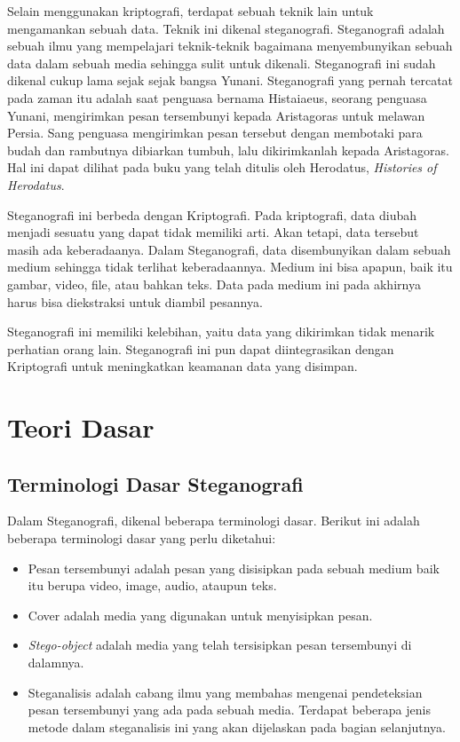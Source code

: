 \documentclass[10pt,conference]{IEEEtran}
\begin{document}
Selain menggunakan kriptografi, terdapat sebuah teknik lain untuk mengamankan sebuah data. Teknik ini dikenal steganografi. Steganografi adalah sebuah ilmu yang mempelajari teknik-teknik bagaimana menyembunyikan sebuah data dalam sebuah media sehingga sulit untuk dikenali. \cite{b1} Steganografi ini sudah dikenal cukup lama sejak sejak bangsa Yunani. Steganografi yang pernah tercatat pada zaman itu adalah saat penguasa bernama Histaiaeus, seorang penguasa Yunani, mengirimkan pesan tersembunyi kepada Aristagoras untuk melawan Persia. Sang penguasa mengirimkan pesan tersebut dengan membotaki para budah dan rambutnya dibiarkan tumbuh, lalu dikirimkanlah kepada Aristagoras. Hal ini dapat dilihat pada buku yang telah ditulis oleh Herodatus, \emph{Histories of Herodatus}.

Steganografi ini berbeda dengan Kriptografi. Pada kriptografi, data diubah menjadi sesuatu yang dapat tidak memiliki arti. Akan tetapi, data tersebut masih ada keberadaanya. Dalam Steganografi, data disembunyikan dalam sebuah medium sehingga tidak terlihat keberadaannya. Medium ini bisa apapun, baik itu gambar, video, file, atau bahkan teks. Data pada medium ini pada akhirnya harus bisa diekstraksi untuk diambil pesannya.

Steganografi ini memiliki kelebihan, yaitu data yang dikirimkan tidak menarik perhatian orang lain. Steganografi ini pun dapat diintegrasikan dengan Kriptografi untuk meningkatkan keamanan data yang disimpan.

\section{Teori Dasar}

\subsection{Terminologi Dasar Steganografi}

Dalam Steganografi, dikenal beberapa terminologi dasar. Berikut ini adalah beberapa terminologi dasar yang perlu diketahui: \cite{b1}

\begin{itemize}
    \item Pesan tersembunyi adalah pesan yang disisipkan pada sebuah medium baik itu berupa video, image, audio, ataupun teks. 
    \item Cover adalah media yang digunakan untuk menyisipkan pesan.
    \item \emph{Stego-object} adalah media yang telah tersisipkan pesan tersembunyi di dalamnya.
    \item Steganalisis adalah cabang ilmu yang membahas mengenai pendeteksian pesan tersembunyi yang ada pada sebuah media. Terdapat beberapa jenis metode dalam steganalisis ini yang akan dijelaskan pada bagian selanjutnya.  
\end{itemize}
\end{document}

